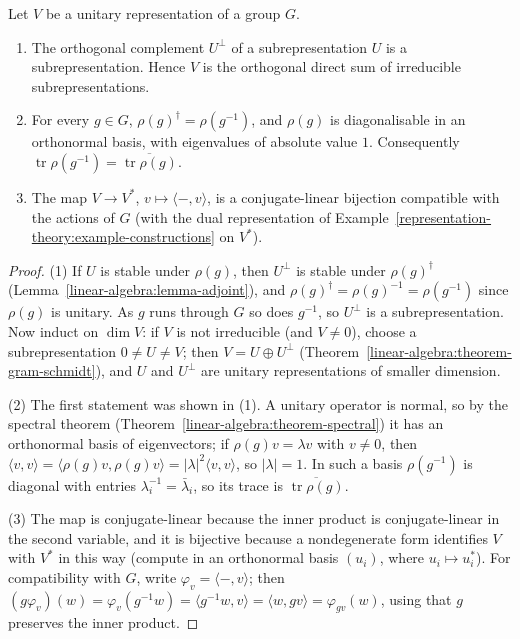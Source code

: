 \begin{proposition}\label{representation-theory:proposition-unitary}
Let $V$ be a unitary representation of a group $G$.
\begin{enumerate}
\item The orthogonal complement $U^\perp$ of a subrepresentation $U$ is a subrepresentation. Hence $V$ is the orthogonal direct sum of irreducible subrepresentations.
\item For every $g \in G$, $\rho(g)^\dagger = \rho(g^{-1})$, and $\rho(g)$ is diagonalisable in an orthonormal basis, with eigenvalues of absolute value $1$. Consequently
$\operatorname{tr}\rho(g^{-1}) = \overline{\operatorname{tr}\rho(g)}$.
\item The map $V \to V^*$, $v \mapsto \langle -, v\rangle$, is a conjugate-linear bijection compatible with the actions of $G$ (with the dual representation of
Example~\ref{representation-theory:example-constructions} on $V^*$).
\end{enumerate}
\end{proposition}

\begin{proof}
(1) If $U$ is stable under $\rho(g)$, then $U^\perp$ is stable under $\rho(g)^\dagger$ (Lemma~\ref{linear-algebra:lemma-adjoint}), and $\rho(g)^\dagger = \rho(g)^{-1} = \rho(g^{-1})$ since $\rho(g)$ is
unitary. As $g$ runs through $G$ so does $g^{-1}$, so $U^\perp$ is a subrepresentation. Now induct on $\dim V$: if $V$ is not irreducible (and $V \neq 0$), choose a subrepresentation
$0 \neq U \neq V$; then $V = U \oplus U^\perp$ (Theorem~\ref{linear-algebra:theorem-gram-schmidt}), and $U$ and $U^\perp$ are unitary representations of smaller dimension.

(2) The first statement was shown in (1). A unitary operator is normal, so by the spectral theorem (Theorem~\ref{linear-algebra:theorem-spectral}) it has an orthonormal basis of
eigenvectors; if $\rho(g)v = \lambda v$ with $v \neq 0$, then $\langle v, v\rangle = \langle \rho(g)v, \rho(g)v\rangle = |\lambda|^2\langle v, v\rangle$, so $|\lambda| = 1$. In such a basis $\rho(g^{-1})$ is
diagonal with entries $\lambda_i^{-1} = \bar\lambda_i$, so its trace is $\overline{\operatorname{tr}\rho(g)}$.

(3) The map is conjugate-linear because the inner product is conjugate-linear in the second variable, and it is bijective because a nondegenerate form identifies $V$ with $V^*$ in this way
(compute in an orthonormal basis $(u_i)$, where $u_i \mapsto u_i^*$). For compatibility with $G$, write $\varphi_v = \langle -, v\rangle$; then
$(g\varphi_v)(w) = \varphi_v(g^{-1}w) = \langle g^{-1}w, v\rangle = \langle w, gv\rangle = \varphi_{gv}(w)$, using that $g$ preserves the inner product.
\end{proof}

